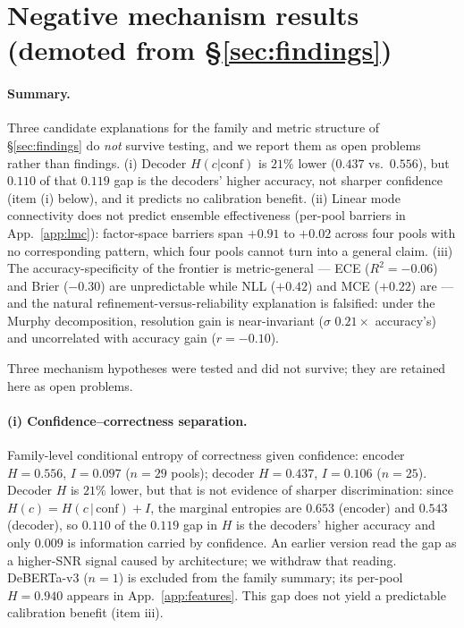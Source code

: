 \documentclass[11pt]{article}
\begin{document}
\section{Negative mechanism results (demoted from \S\ref{sec:findings})}\label{app:mech}

\paragraph{Summary.} Three candidate explanations for the family and metric structure of \S\ref{sec:findings} do \emph{not} survive testing, and we report them as open problems rather than findings. (i) Decoder $H(c|\mathrm{conf})$ is $21\%$ lower ($0.437$ vs.\ $0.556$), but $0.110$ of that $0.119$ gap is the decoders' higher accuracy, not sharper confidence (item (i) below), and it predicts no calibration benefit. (ii) Linear mode connectivity does not predict ensemble effectiveness (per-pool barriers in App.~\ref{app:lmc}): factor-space barriers span $+0.91$ to $+0.02$ across four pools with no corresponding pattern, which four pools cannot turn into a general claim. (iii) The accuracy-specificity of the frontier is metric-general --- ECE ($R^2{=}{-}0.06$) and Brier ($-0.30$) are unpredictable while NLL ($+0.42$) and MCE ($+0.22$) are --- and the natural refinement-versus-reliability explanation is falsified: under the Murphy decomposition, resolution gain is near-invariant ($\sigma$ $0.21{\times}$ accuracy's) and uncorrelated with accuracy gain ($r{=}{-}0.10$).

Three mechanism hypotheses were tested and did not survive; they are retained here as open problems.

\paragraph{(i) Confidence--correctness separation.} Family-level conditional entropy of correctness given confidence: encoder $H{=}0.556$, $I{=}0.097$ ($n{=}29$ pools); decoder $H{=}0.437$, $I{=}0.106$ ($n{=}25$). Decoder $H$ is $21\%$ lower, but that is not evidence of sharper discrimination: since $H(c){=}H(c\,|\,\mathrm{conf}){+}I$, the marginal entropies are $0.653$ (encoder) and $0.543$ (decoder), so $0.110$ of the $0.119$ gap in $H$ is the decoders' higher accuracy and only $0.009$ is information carried by confidence. An earlier version read the gap as a higher-SNR signal caused by architecture; we withdraw that reading. DeBERTa-v3 ($n{=}1$) is excluded from the family summary; its per-pool $H{=}0.940$ appears in App.~\ref{app:features}. This gap does not yield a predictable calibration benefit (item iii).
\end{document}
